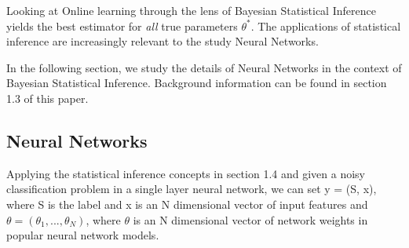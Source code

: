 																																																																																																																																																																																																	     Looking at Online learning through the lens of Bayesian Statistical Inference yields the best estimator for \textit{all} true parameters $\theta^*$. The applications of statistical inference are increasingly relevant to the study Neural Networks. \vspace{4mm}
																																																																																																																																																																																																		     
																																																																																																																																																																																																			     \noindent In the following section, we study the details of Neural Networks in the context of Bayesian Statistical Inference. Background information can be found in section 1.3 of this paper.
																																																																																																																																																																																																				     
																																																																																																																																																																																																					 \subsection{Neural Networks}
																																																																																																																																																																																																					     
																																																																																																																																																																																																						     Applying the statistical inference concepts in section 1.4 and given a noisy classification problem in a single layer neural network, we can set y = (S, x), where S is the label and x is an N dimensional vector of input features and $\theta = (\theta_1,...,\theta_N)$, where $\theta$ is an N dimensional vector of network weights in popular neural network models. \vspace{4mm}
																																																																																																																																																																																																							     
